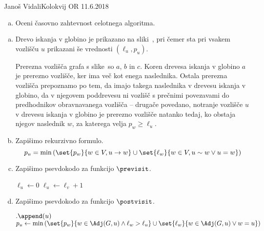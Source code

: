 \begin{naloga}{Janoš Vidali}{Kolokvij OR 11.6.2018}
\begin{vprasanje}
\begin{enumerate}[(a)]
\item Oceni časovno zahtevnost celotnega algoritma.
\end{enumerate}

\begin{slika}
\pgfslika
{}
\end{slika}
\end{vprasanje}

\begin{odgovor}
\begin{enumerate}[(a)]
\item Drevo iskanja v globino je prikazano na sliki~,
pri čemer sta pri vsakem vozlišču $u$ prikazani še vrednosti $(\ell_u, p_u)$.

Prerezna vozlišča grafa s slike~\fig so $a$, $b$ in $c$.
Koren drevesa iskanja v globino $a$ je prerezno vozlišče,
ker ima več kot enega naslednika.
Ostala prerezna vozlišča prepoznamo po tem,
da imajo takega naslednika v drevesu iskanja v globino,
da v njegovem poddrevesu ni vozlišč s prečnimi povezavami
do predhodnikov obravnavanega vozlišča
-- drugače povedano,
notranje vozlišče $u$ v drevesu iskanja v globino
je prerezno vozlišče natanko tedaj,
ko obstaja njegov naslednik $w$,
za katerega velja $p_w \ge \ell_u$.

\item Zapišimo rekurzivno formulo.
$$
p_u = \min\left(\set{p_w}{w \in V, u \to w} \cup \set{\ell_w}{w \in V, u \sim w \lor u = w}\right)
$$

\needspace{\baselineskip}
\item Zapišimo psevdokodo za funkcijo $\previsit$.
\begin{small}
\begin{algorithmic}
        \State $\ell_u \gets 0$
    \Else
        \State $\ell_u \gets \ell_v + 1$
    \EndIf
\EndFunction
\end{algorithmic}
\end{small}

\item Zapišimo psevdokodo za funkcijo $\postvisit$.
\begin{small}
\begin{algorithmic}
        $.\append(u)$
    \EndIf
    \State $p_u \gets \min\left(\set{p_w}{w \in \Adj(G, u) \land \ell_w > \ell_u} \cup \set{\ell_w}{w \in \Adj(G, u) \lor w = u}\right)$
\EndFunction
\end{algorithmic}
\end{small}


\end{enumerate}
\end{odgovor}
\end{naloga}
